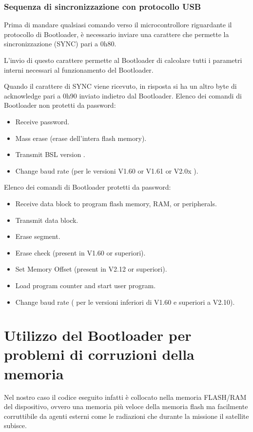 \documentclass[LaM,binding=0.6cm]{../sapthesis}
\begin{document}
\subsubsection{Sequenza di sincronizzazione con protocollo USB}

Prima di mandare qualsiasi comando verso il microcontrollore riguardante il protocollo di Bootloader, è necessario inviare una carattere che permette la sincronizzazione (SYNC) pari a 0h80.

L’invio di questo carattere permette al Bootloader di calcolare tutti i parametri interni necessari al funzionamento del Bootloader.

Quando il carattere di SYNC viene ricevuto, in risposta si ha un altro byte di acknowledge pari a 0h90 inviato indietro dal Bootloader.
\vspace{0.5cm}
Elenco dei comandi di Bootloader non protetti da password:
\begin{itemize}
\item Receive password.
\item Mass erase (erase dell’intera flash memory).
\item Transmit BSL version .
\item Change baud rate  (per le versioni V1.60 or V1.61 or V2.0x ).
\end{itemize}
\vspace{0.5cm}
Elenco dei comandi di Bootloader protetti da password:

\begin{itemize}
\item Receive data block to program flash memory, RAM, or peripherals.
\item Transmit data block.
\item Erase segment.
\item Erase check (present in V1.60 or superiori).
\item Set Memory Offset (present in V2.12 or superiori).
\item Load program counter and start user program.
\item Change baud rate ( per le versioni inferiori di V1.60 e superiori a V2.10).
\end{itemize}

\section{Utilizzo del Bootloader per problemi di corruzioni della memoria}

Nel nostro caso il codice eseguito infatti è collocato nella memoria FLASH/RAM del dispositivo, ovvero una memoria più veloce della memoria flash ma facilmente corruttibile da agenti esterni come le radiazioni che durante la missione il satellite subisce.\newline
\end{document}
